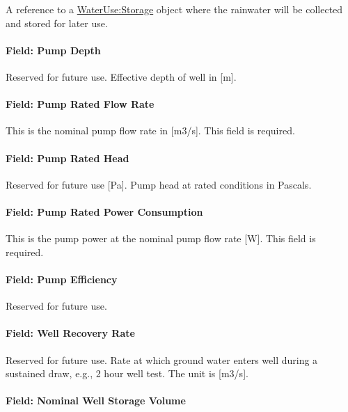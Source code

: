 A reference to a \hyperref[waterusestorage]{WaterUse:Storage} object where the rainwater will be collected and stored for later use.

\paragraph{Field: Pump Depth}\label{field-pump-depth}

Reserved for future use. Effective depth of well in {[}m{]}.

\paragraph{Field: Pump Rated Flow Rate}\label{field-pump-rated-flow-rate}

This is the nominal pump flow rate in {[}m3/s{]}. This field is required.

\paragraph{Field: Pump Rated Head}\label{field-pump-rated-head}

Reserved for future use {[}Pa{]}. Pump head at rated conditions in Pascals.

\paragraph{Field: Pump Rated Power Consumption}\label{field-pump-rated-power-consumption}

This is the pump power at the nominal pump flow rate {[}W{]}. This field is required.

\paragraph{Field: Pump Efficiency}\label{field-pump-efficiency}

Reserved for future use.

\paragraph{Field: Well Recovery Rate}\label{field-well-recovery-rate}

Reserved for future use. Rate at which ground water enters well during a sustained draw, e.g., 2 hour well test. The unit is {[}m3/s{]}.

\paragraph{Field: Nominal Well Storage Volume}\label{field-nominal-well-storage-volume}

